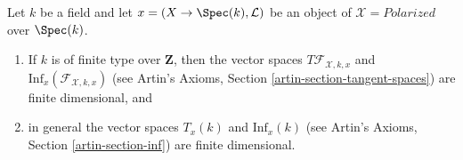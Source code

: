 \begin{lemma}
\label{lemma-polarized-tangent-space}
Let $k$ be a field and let $x = (X \to \Spec(k), \mathcal{L})$
be an object of $\mathcal{X} = \textit{Polarized}$ over $\Spec(k)$.
\begin{enumerate}
\item If $k$ is of finite type over $\mathbf{Z}$, then
the vector spaces $T\mathcal{F}_{\mathcal{X}, k, x}$ and
$\text{Inf}_x(\mathcal{F}_{\mathcal{X}, k, x})$
(see Artin's Axioms, Section \ref{artin-section-tangent-spaces})
are finite dimensional, and
\item in general the vector spaces $T_x(k)$ and $\text{Inf}_x(k)$
(see Artin's Axioms, Section \ref{artin-section-inf})
are finite dimensional.
\end{enumerate}
\end{lemma}

